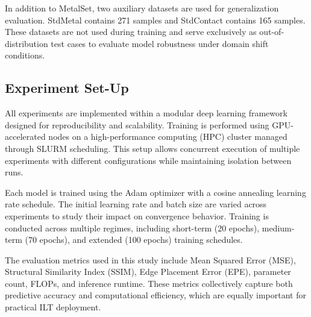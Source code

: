\documentclass[conference]{IEEEtran}
\begin{document}
\begin{table}[!t]
\centering
\caption{Dataset composition and usage in ILT experiments}
\label{tab:dataset_split}
\renewcommand{\arraystretch}{1.2}


\end{table}



In addition to MetalSet, two auxiliary datasets are used for generalization evaluation. StdMetal contains 271 samples and StdContact contains 165 samples. These datasets are not used during training and serve exclusively as out-of-distribution test cases to evaluate model robustness under domain shift conditions.

\subsection{\textbf{Experiment Set-Up}}

All experiments are implemented within a modular deep learning framework designed for reproducibility and scalability. Training is performed using GPU-accelerated nodes on a high-performance computing (HPC) cluster managed through SLURM scheduling. This setup allows concurrent execution of multiple experiments with different configurations while maintaining isolation between runs.

Each model is trained using the Adam optimizer with a cosine annealing learning rate schedule. The initial learning rate and batch size are varied across experiments to study their impact on convergence behavior. Training is conducted across multiple regimes, including short-term (20 epochs), medium-term (70 epochs), and extended (100 epochs) training schedules.

The evaluation metrics used in this study include Mean Squared Error (MSE), Structural Similarity Index (SSIM), Edge Placement Error (EPE), parameter count, FLOPs, and inference runtime. These metrics collectively capture both predictive accuracy and computational efficiency, which are equally important for practical ILT deployment.
\end{document}
